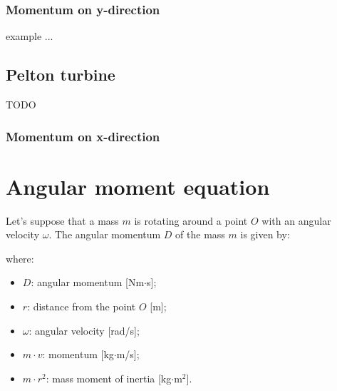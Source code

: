 \documentclass{article}
\begin{document}
\newpage
\subsubsection{Momentum on y-direction}

example ...

\subsection{Pelton turbine}
TODO

\subsubsection{Momentum on x-direction}

\section{Angular moment equation}
Let's suppose that a mass $m$ is rotating around a point $O$ with an angular velocity $\omega$.
The angular momentum $D$ of the mass $m$ is given by:

where:
\begin{itemize}
    \item $D$: angular momentum [Nm$\cdot$s];
    \item $r$: distance from the point $O$ [m];
    \item $\omega$: angular velocity [rad/s];
    \item $m\cdot v$: momentum [kg$\cdot$m/s];
    \item $m\cdot r^2$: mass moment of inertia [kg$\cdot$m$^2$].
\end{itemize}
\end{document}
